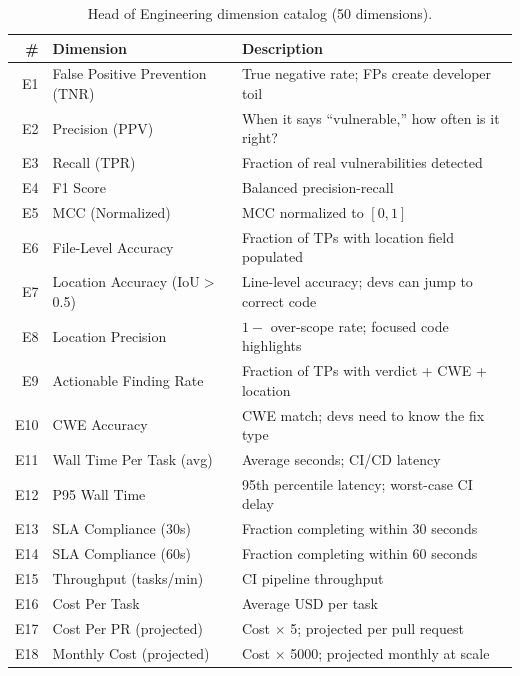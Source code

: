 \documentclass[10pt,twocolumn]{article}
\begin{document}
\begin{table}[t]
\centering
\caption{Head of Engineering dimension catalog (50 dimensions).}
\label{tab:engineer_dims}
\small
\begin{tabular}{@{}r l p{7.5cm}@{}}
\toprule
\textbf{\#} & \textbf{Dimension} & \textbf{Description} \\
\midrule
E1  & False Positive Prevention (TNR)     & True negative rate; FPs create developer toil \\
E2  & Precision (PPV)                     & When it says ``vulnerable,'' how often is it right? \\
E3  & Recall (TPR)                        & Fraction of real vulnerabilities detected \\
E4  & F1 Score                            & Balanced precision-recall \\
E5  & MCC (Normalized)                    & MCC normalized to $[0,1]$ \\
E6  & File-Level Accuracy                 & Fraction of TPs with location field populated \\
E7  & Location Accuracy (IoU${>}$0.5)     & Line-level accuracy; devs can jump to correct code \\
E8  & Location Precision                  & $1 -$ over-scope rate; focused code highlights \\
E9  & Actionable Finding Rate             & Fraction of TPs with verdict + CWE + location \\
E10 & CWE Accuracy                        & CWE match; devs need to know the fix type \\
E11 & Wall Time Per Task (avg)            & Average seconds; CI/CD latency \\
E12 & P95 Wall Time                       & 95th percentile latency; worst-case CI delay \\
E13 & SLA Compliance (30s)                & Fraction completing within 30 seconds \\
E14 & SLA Compliance (60s)                & Fraction completing within 60 seconds \\
E15 & Throughput (tasks/min)              & CI pipeline throughput \\
E16 & Cost Per Task                       & Average USD per task \\
E17 & Cost Per PR (projected)             & Cost ${\times}$ 5; projected per pull request \\
E18 & Monthly Cost (projected)            & Cost ${\times}$ 5000; projected monthly at scale \\

\end{tabular}
\end{table}
\end{document}
